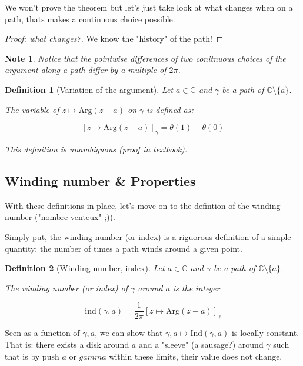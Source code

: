 \documentclass{article}
\newtheorem*{defi}{Definition}
\newtheorem*{note}{Note}
\begin{document}
We won't prove the theorem but let's just take look at what changes when on a path, thats makes a continuous choice possible.

\begin{proof}[Proof: what changes?]
We know the "history" of the path!
\end{proof}

\begin{note}
    Notice that the pointwise differences of two conitnuous choices of the argument along a path differ by a multiple of $2\pi$.
\end{note}

\begin{defi}[Variation of the argument]
    Let $a\in\mathbb{C}$ and $\gamma$ be a path of $\mathbb{C} \setminus \lbrace a \rbrace$.

    The variable of $z \mapsto \mathrm{Arg}(z-a)$ on $\gamma$ is defined as:

    $$[z \mapsto \mathrm{Arg}(z-a)]_\gamma = \theta(1) - \theta(0) $$

    This definition is unambiguous (proof in textbook).
\end{defi}

\subsection{Winding number \& Properties}
With these definitions in place, let's move on to the defintion of the winding number ("nombre venteux" ;)). 

Simply put, the winding number (or index) is a riguorous definition of a simple quantity: the number of times a path winds around a given point.

\begin{defi}[Winding number, index]
    Let $a\in\mathbb{C}$ and $\gamma$ be a path of $\mathbb{C} \setminus \lbrace a \rbrace$.
    
    The winding number (or index) of $\gamma$ around $a$ is the integer

    $$ \mathrm{ind}(\gamma, a) = \frac{1}{2\pi}[z \mapsto \mathrm{Arg}(z-a)]_\gamma $$
\end{defi}

Seen as a function of $\gamma, a$, we can show that $\gamma, a \mapsto \mathrm{Ind}(\gamma, a)$ is locally constant. That is: there exists a disk around $a$ and a "sleeve" (a sausage?) around $\gamma$ such that is by push $a$ or $gamma$ within these limits, their value does not change.
\end{document}
